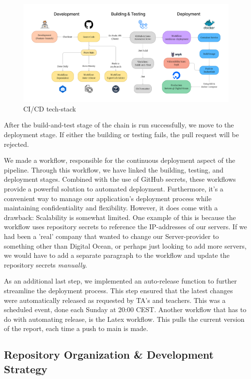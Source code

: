 \begin{figure}
    \centering
    \includegraphics[width=1.0\linewidth]{Images/CICD_Chain.png}
    \caption{CI/CD tech-stack}
    \label{fig:CI/CD Overview}
\end{figure}

After the build-and-test stage of the chain is run successfully, we move to the deployment stage. If either the building or testing fails, the pull request will be rejected.

We made a workflow, responsible for the continuous deployment aspect of the pipeline. Through this workflow, we have linked the building, testing, and deployment stages. Combined with the use of GitHub secrets, these workflows provide a powerful solution to automated deployment. Furthermore, it's a convenient way to manage our application's deployment process while maintaining confidentiality and flexibility. 
However, it does come with a drawback: Scalability is somewhat limited. One example of this is because the workflow uses repository secrets to reference the IP-addresses of our servers.
If we had been a 'real' company that wanted to change our Server-provider to something other than Digital Ocean, or perhaps just looking to add more servers, we would have to add a separate paragraph to the workflow and update the repository secrets \textit{manually}.

\noindent As an additional last step, we implemented an auto-release function to further streamline the deployment process. This step ensured that the latest changes were automatically released as requested by TA's and teachers. This was a scheduled event, done each Sunday at 20:00 CEST. Another workflow that has to do with automating release, is the Latex workflow. This pulls the current version of the report, each time a push to main is made.

\subsection{Repository Organization \& Development Strategy}
